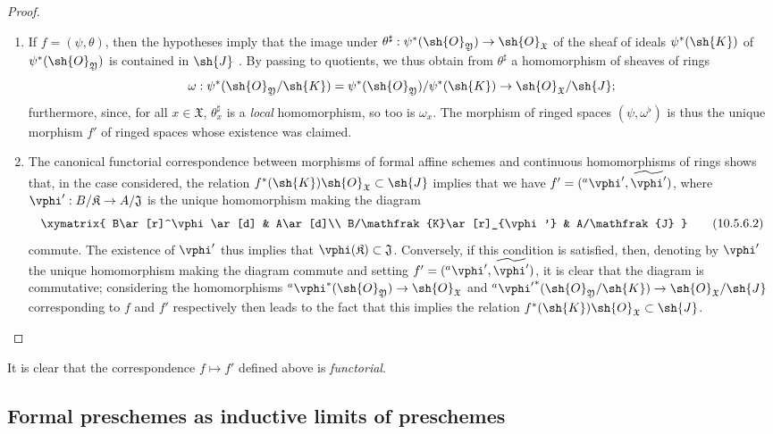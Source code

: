 \begin{proof}
\medskip\noindent
\begin{enumerate}
  \item[\rm{(i)}] If $f=(\psi,\theta)$, then the hypotheses imply that the image under $\theta^\sharp:\psi^*(\sh{O}_\mathfrak{Y})\to\sh{O}_\mathfrak{X}$ of the sheaf of ideals $\psi^*(\sh{K})$ of $\psi^*(\sh{O}_\mathfrak{Y})$ is contained in $\sh{J}$ .
    By passing to quotients, we thus obtain from $\theta^\sharp$ a homomorphism of sheaves of rings
    \[
      \omega:\psi^*(\sh{O}_\mathfrak{Y}/\sh{K})=\psi^*(\sh{O}_\mathfrak{Y})/\psi^*(\sh{K})\to\sh{O}_\mathfrak{X}/\sh{J};
    \]
    furthermore, since, for all $x\in\mathfrak{X}$, $\theta_x^\sharp$ is a \emph{local} homomorphism, so too is $\omega_x$.
    The morphism of ringed spaces $(\psi,\omega^\flat)$ is thus  the unique morphism $f'$ of ringed spaces whose existence was claimed.
  \item[\rm{(ii)}] The canonical functorial correspondence between morphisms of formal affine schemes and continuous homomorphisms of rings  shows that, in the case considered, the relation $f^*(\sh{K})\sh{O}_\mathfrak{X}\subset\sh{J}$ implies that we have $f'=({}^a\vphi',\widetilde{\vphi'})$, where $\vphi':B/\mathfrak{K}\to A/\mathfrak{J}$ is the unique homomorphism making the diagram
    \[
    \label{I.10.5.6.2}
      \xymatrix{
        B\ar[r]^\vphi\ar[d] &
        A\ar[d]\\
        B/\mathfrak{K}\ar[r]_{\vphi'} &
        A/\mathfrak{J}
      }
      \tag{10.5.6.2}
    \]
    commute.
    The existence of $\vphi'$ thus implies that $\vphi(\mathfrak{K})\subset\mathfrak{J}$.
    Conversely, if this condition is satisfied, then, denoting by $\vphi'$ the unique homomorphism making the diagram  commute and setting $f'=({}^a\vphi',\widetilde{\vphi'})$, it is clear that the diagram  is commutative; considering the homomorphisms ${}^a\vphi^*(\sh{O}_\mathfrak{Y})\to\sh{O}_\mathfrak{X}$ and ${}^a{\vphi'}^*(\sh{O}_\mathfrak{Y}/\sh{K})\to\sh{O}_\mathfrak{X}/\sh{J}$ corresponding to $f$ and $f'$ respectively then leads to the fact that this implies the relation $f^*(\sh{K})\sh{O}_\mathfrak{X}\subset\sh{J}$.
\end{enumerate}
\end{proof}

It is clear that the correspondence $f\mapsto f'$ defined above is \emph{functorial}.

\subsection{Formal preschemes as inductive limits of preschemes}
\label{subsection:I.10.6}

